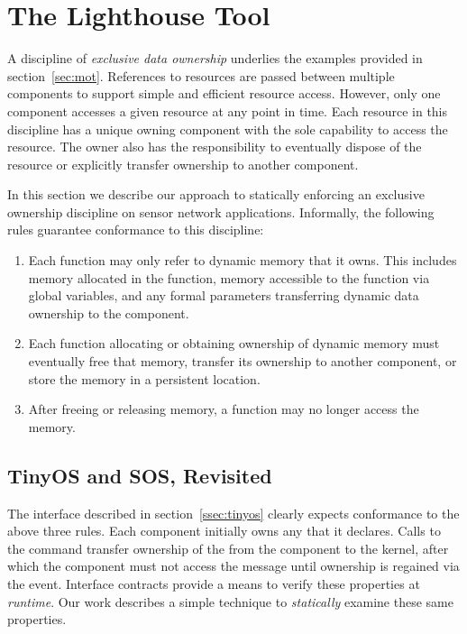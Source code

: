 \section{The Lighthouse Tool}
\label{sec:alg}



A discipline of {\em exclusive data ownership} underlies the examples
provided in section~\ref{sec:mot}.
%
References to resources are passed between multiple components to support
simple and efficient resource access.
%
However, only one component accesses a given resource at any point in time.
%
Each resource in this discipline has a unique owning component with the sole
capability to access the resource.
%
The owner also has the responsibility to eventually dispose of the resource or
explicitly transfer ownership to another component.



In this section we describe our approach to statically enforcing an exclusive
ownership discipline on sensor network applications.  
%
Informally, the following rules guarantee conformance to this discipline:
%
\begin{enumerate}
%
\item Each function may only refer to dynamic memory that it owns.  This
includes memory allocated in the function, memory accessible to the function
via global variables, and any formal parameters transferring dynamic data ownership to
the component.
%
\item Each function allocating or obtaining ownership of dynamic memory must
eventually free that memory, transfer its ownership to another component, or
store the memory in a persistent location.
%
\item After freeing or releasing memory, a function may no longer access the
memory.
%
\end{enumerate}



\subsection{TinyOS and SOS, Revisited}



The  interface described in section~\ref{ssec:tinyos} clearly
expects conformance to the above three rules.
%
Each component initially owns any  that it declares.
%
Calls to the  command transfer ownership of the 
from the component to the kernel, after which the component must not access
the message until ownership is regained via the  event.
%
Interface contracts provide a means to verify these properties at {\em
runtime}.
%
Our work describes a simple technique to {\em statically} examine these same
properties.
 


